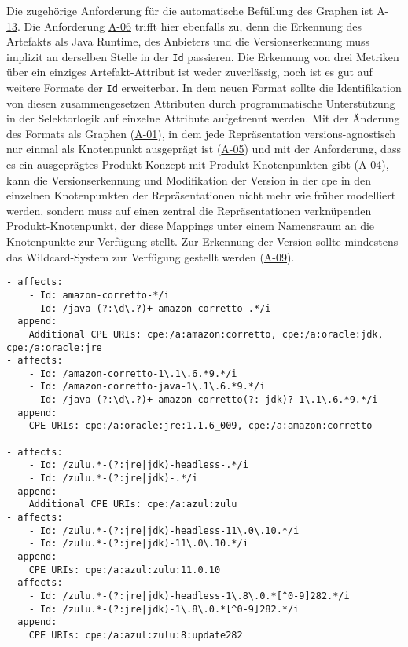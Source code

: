 Die zugehörige Anforderung für die automatische Befüllung des Graphen ist \hyperref[subsec:req-generated-data]{A-13}.
Die Anforderung \hyperref[subsec:req-type-specific-matching]{A-06} trifft hier ebenfalls zu, denn die Erkennung des Artefakts als Java Runtime, des Anbieters und die Versionserkennung muss implizit an derselben Stelle in der \texttt{Id} passieren.
Die Erkennung von drei Metriken über ein einziges Artefakt-Attribut ist weder zuverlässig, noch ist es gut auf weitere Formate der \texttt{Id} erweiterbar.
In dem neuen Format sollte die Identifikation von diesen zusammengesetzen Attributen durch programmatische Unterstützung in der Selektorlogik auf einzelne Attribute aufgetrennt werden.
Mit der Änderung des Formats als Graphen (\hyperref[subsec:req-format-product-graph]{A-01}), in dem jede Repräsentation versions-agnostisch nur einmal als Knotenpunkt ausgeprägt ist (\hyperref[subsec:req-unique-product-representations]{A-05}) und mit der Anforderung, dass es ein ausgeprägtes Produkt-Konzept mit Produkt-Knotenpunkten gibt (\hyperref[subsec:req-product-concept]{A-04}), kann die Versionserkennung und Modifikation der Version in der \acrshort{cpe} in den einzelnen Knotenpunkten der Repräsentationen nicht mehr wie früher modelliert werden, sondern muss auf einen zentral die Repräsentationen verknüpenden Produkt-Knotenpunkt, der diese Mappings unter einem Namensraum an die Knotenpunkte zur Verfügung stellt.
Zur Erkennung der Version sollte mindestens das Wildcard-System zur Verfügung gestellt werden (\hyperref[subsec:req-regex-support]{A-09}).

\begin{lstlisting}[style=yaml,caption={Java-Runtime-Korrelation mit Versionstransformation},label={lst:reference-case-java-runtimes},basicstyle=\ttfamily\scriptsize]
- affects:
    - Id: amazon-corretto-*/i
    - Id: /java-(?:\d\.?)+-amazon-corretto-.*/i
  append:
    Additional CPE URIs: cpe:/a:amazon:corretto, cpe:/a:oracle:jdk, cpe:/a:oracle:jre
- affects:
    - Id: /amazon-corretto-1\.1\.6.*9.*/i
    - Id: /amazon-corretto-java-1\.1\.6.*9.*/i
    - Id: /java-(?:\d\.?)+-amazon-corretto(?:-jdk)?-1\.1\.6.*9.*/i
  append:
    CPE URIs: cpe:/a:oracle:jre:1.1.6_009, cpe:/a:amazon:corretto

- affects:
    - Id: /zulu.*-(?:jre|jdk)-headless-.*/i
    - Id: /zulu.*-(?:jre|jdk)-.*/i
  append:
    Additional CPE URIs: cpe:/a:azul:zulu
- affects:
    - Id: /zulu.*-(?:jre|jdk)-headless-11\.0\.10.*/i
    - Id: /zulu.*-(?:jre|jdk)-11\.0\.10.*/i
  append:
    CPE URIs: cpe:/a:azul:zulu:11.0.10
- affects:
    - Id: /zulu.*-(?:jre|jdk)-headless-1\.8\.0.*[^0-9]282.*/i
    - Id: /zulu.*-(?:jre|jdk)-1\.8\.0.*[^0-9]282.*/i
  append:
    CPE URIs: cpe:/a:azul:zulu:8:update282
\end{lstlisting}

